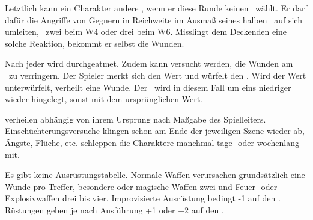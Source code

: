 \begin{multicols}{2}
Letztlich kann ein Charakter andere , wenn er diese Runde keinen \AW\ wählt. Er darf dafür die Angriffe von Gegnern in Reichweite im Ausmaß seines halben \RW\ auf sich umleiten, \zB\ zwei beim W4 oder drei beim W6. Misslingt dem Deckenden eine solche Reaktion, bekommt er selbst die Wunden.


Nach jeder  wird durchgeatmet. Zudem kann versucht werden, die Wunden am \WW\ zu verringern. Der Spieler merkt sich den Wert und würfelt den \WW. Wird der Wert unterwürfelt, verheilt eine Wunde. Der \WW\ wird in diesem Fall um eins niedriger wieder hingelegt, sonst mit dem ursprünglichen Wert.

 verheilen abhängig von ihrem Ursprung nach Maßgabe des Spielleiters. Einschüchterungsversuche klingen schon am Ende der jeweiligen Szene wieder ab, Ängste, Flüche, etc. schleppen die Charaktere manchmal tage- oder wochenlang mit.


Es gibt keine Ausrüstungstabelle. Normale Waffen verursachen grundsätzlich eine Wunde pro Treffer, besondere oder magische Waffen zwei und Feuer- oder Explosivwaffen drei bis vier. Improvisierte Ausrüstung bedingt -1 auf den \AW. Rüstungen geben je nach Ausführung +1 oder +2 auf den \RW.

\end{multicols}


